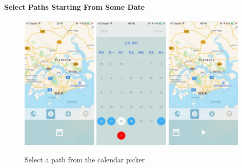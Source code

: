 \documentclass[12pt,a4paper]{article}
\begin{document}
                \paragraph{Select Paths Starting From Some Date}
                \begin{figure}[H]
                    \includegraphics[width=0.32\textwidth]{2-4-1-2-a}
                    \includegraphics[width=0.32\textwidth]{2-4-1-2-b}
                    \includegraphics[width=0.32\textwidth]{2-4-1-2-c}
                    \centering
                    \caption{Select a path from the calendar picker}
                    \label{fig:select-path-calendar}
                \end{figure}
                
\end{document}
